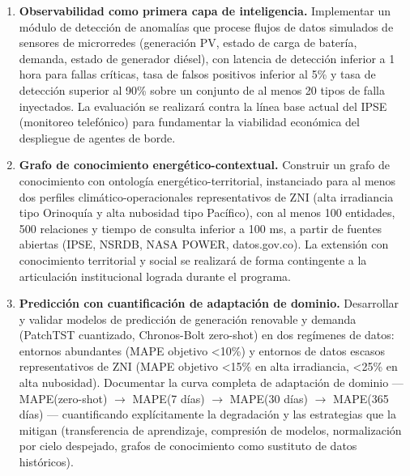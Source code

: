 \documentclass[12pt,letterpaper]{article}
\begin{document}
\begin{enumerate}[start=0]
\item \textbf{Observabilidad como primera capa de inteligencia.} Implementar un m\'odulo de detecci\'on de anomal\'ias que procese flujos de datos simulados de sensores de microrredes (generaci\'on PV, estado de carga de bater\'ia, demanda, estado de generador di\'esel), con latencia de detecci\'on inferior a 1 hora para fallas cr\'iticas, tasa de falsos positivos inferior al 5\% y tasa de detecci\'on superior al 90\% sobre un conjunto de al menos 20 tipos de falla inyectados. La evaluaci\'on se realizar\'a contra la l\'inea base actual del IPSE (monitoreo telef\'onico) para fundamentar la viabilidad econ\'omica del despliegue de agentes de borde.

\item \textbf{Grafo de conocimiento energ\'etico-contextual.} Construir un grafo de conocimiento con ontolog\'ia energ\'etico-territorial, instanciado para al menos dos perfiles clim\'atico-operacionales representativos de ZNI (alta irradiancia tipo Orinoqu\'ia y alta nubosidad tipo Pac\'ifico), con al menos 100 entidades, 500 relaciones y tiempo de consulta inferior a 100 ms, a partir de fuentes abiertas (IPSE, NSRDB, NASA POWER, datos.gov.co). La extensi\'on con conocimiento territorial y social se realizar\'a de forma contingente a la articulaci\'on institucional lograda durante el programa.

\item \textbf{Predicci\'on con cuantificaci\'on de adaptaci\'on de dominio.} Desarrollar y validar modelos de predicci\'on de generaci\'on renovable y demanda (PatchTST cuantizado, Chronos-Bolt zero-shot) en dos reg\'imenes de datos: entornos abundantes (MAPE objetivo <10\%) y entornos de datos escasos representativos de ZNI (MAPE objetivo <15\% en alta irradiancia, <25\% en alta nubosidad). Documentar la curva completa de adaptaci\'on de dominio --- MAPE(zero-shot) $\rightarrow$ MAPE(7 d\'ias) $\rightarrow$ MAPE(30 d\'ias) $\rightarrow$ MAPE(365 d\'ias) --- cuantificando expl\'icitamente la degradaci\'on y las estrategias que la mitigan (transferencia de aprendizaje, compresi\'on de modelos, normalizaci\'on por cielo despejado, grafos de conocimiento como sustituto de datos hist\'oricos).


\end{enumerate}
\end{document}
